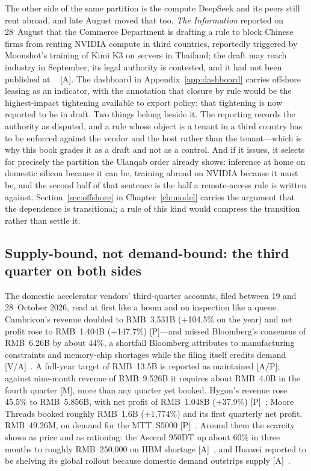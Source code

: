 The other side of the same partition is the compute DeepSeek and its peers still rent abroad, and late August moved that too. \emph{The Information} reported on 28~August that the Commerce Department is drafting a rule to block Chinese firms from renting NVIDIA compute in third countries, reportedly triggered by Moonshot's training of Kimi K3 on servers in Thailand; the draft may reach industry in September, its legal authority is contested, and it had not been published at \datafreeze~\cite{remote-access-rule} [A]. The dashboard in Appendix~\ref{app:dashboard} carries offshore leasing as an indicator, with the annotation that closure by rule would be the highest-impact tightening available to export policy; that tightening is now reported to be in draft. Two things belong beside it. The reporting records the authority as disputed, and a rule whose object is a tenant in a third country has to be enforced against the vendor and the host rather than the tenant---which is why this book grades it as a draft and not as a control. And if it issues, it selects for precisely the partition the Ulanqab order already shows: inference at home on domestic silicon because it can be, training abroad on NVIDIA because it must be, and the second half of that sentence is the half a remote-access rule is written against. Section~\ref{sec:offshore} in Chapter~\ref{ch:model} carries the argument that the dependence is transitional; a rule of this kind would compress the transition rather than settle it.

\subsection{Supply-bound, not demand-bound: the third quarter on both sides}
\label{sec:hw-supply-bound}

The domestic accelerator vendors' third-quarter accounts, filed between 19 and 28~October 2026, read at first like a boom and on inspection like a queue. Cambricon's revenue doubled to RMB~3.531B ($+$104.5\% on the year) and net profit rose to RMB~1.404B ($+$147.7\%) [P]---and missed Bloomberg's consensus of RMB~6.26B by about 44\%, a shortfall Bloomberg attributes to manufacturing constraints and memory-chip shortages while the filing itself credits demand [V/A]~\cite{hw-cambricon-q3}. A full-year target of RMB~13.5B is reported as maintained [A/P]; against nine-month revenue of RMB~9.526B it requires about RMB~4.0B in the fourth quarter [M], more than any quarter yet booked. Hygon's revenue rose 45.5\% to RMB~5.856B, with net profit of RMB~1.048B ($+$37.9\%) [P]~\cite{hw-hygon-q3}; Moore Threads booked roughly RMB~1.6B ($+$1,774\%) and its first quarterly net profit, RMB~49.26M, on demand for the MTT~S5000 [P]~\cite{hw-moore-threads-q3}. Around them the scarcity shows as price and as rationing: the Ascend 950DT up about 60\% in three months to roughly RMB~250{,}000 on HBM shortage [A]~\cite{hw-ascend-price}, and Huawei reported to be shelving its global rollout because domestic demand outstrips supply [A]~\cite{hw-huawei-connect-2026}.

